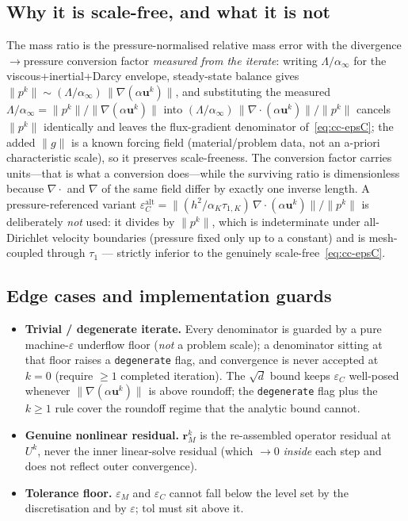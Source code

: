 \documentclass{article}
\newcommand{\code}[1]{\texttt{\small #1}}
\begin{document}
\subsection{Why it is scale-free, and what it is not}
The mass ratio is the pressure-normalised relative mass error with the divergence$\to$pressure
conversion factor \emph{measured from the iterate}: writing $\Lambda/\alpha_\infty$ for the
viscous+inertial+Darcy envelope, steady-state balance gives $\|p^k\|\sim(\Lambda/\alpha_\infty)\,
\|\nabla(\alpha\boldsymbol{u}^k)\|$, and substituting the measured
$\Lambda/\alpha_\infty=\|p^k\|/\|\nabla(\alpha\boldsymbol{u}^k)\|$ into
$(\Lambda/\alpha_\infty)\,\|\nabla\!\cdot\!(\alpha\boldsymbol{u}^k)\|/\|p^k\|$ cancels $\|p^k\|$
identically and leaves the flux-gradient denominator of~\eqref{eq:cc-epsC}; the added $\|g\|$ is a
known forcing field (material/problem data, not an a-priori characteristic scale), so it preserves
scale-freeness. The conversion factor carries units---that is what a
conversion does---while the surviving ratio is dimensionless because $\nabla\!\cdot$ and $\nabla$ of
the same field differ by exactly one inverse length. A pressure-referenced variant
$\varepsilon_C^{\mathrm{alt}}=\|(h^2/\alpha_K\tau_{1,K})\,\nabla\!\cdot\!(\alpha\boldsymbol{u}^k)\|/\|p^k\|$
is deliberately \emph{not} used: it divides by $\|p^k\|$, which is indeterminate under all-Dirichlet
velocity boundaries (pressure fixed only up to a constant) and is mesh-coupled through $\tau_1$ ---
strictly inferior to the genuinely scale-free~\eqref{eq:cc-epsC}.

\subsection{Edge cases and implementation guards}
\begin{itemize}
    \item \textbf{Trivial / degenerate iterate.} Every denominator is guarded by a pure machine-$\varepsilon$
    underflow floor (\emph{not} a problem scale); a denominator sitting at that floor raises a
    \code{degenerate} flag, and convergence is never accepted at $k=0$ (require $\ge1$ completed
    iteration). The $\sqrt{d}$ bound keeps $\varepsilon_C$ well-posed whenever
    $\|\nabla(\alpha\boldsymbol{u}^k)\|$ is above roundoff; the \code{degenerate} flag plus the
    $k\ge1$ rule cover the roundoff regime that the analytic bound cannot.
    \item \textbf{Genuine nonlinear residual.} $\boldsymbol{r}_M^k$ is the re-assembled operator residual
    at $U^k$, never the inner linear-solve residual (which $\to0$ \emph{inside} each step and does not
    reflect outer convergence).
    \item \textbf{Tolerance floor.} $\varepsilon_M$ and $\varepsilon_C$ cannot fall below the level set
    by the discretisation and by $\varepsilon$; $\mathrm{tol}$ must sit above it.
\end{itemize}
\end{document}
